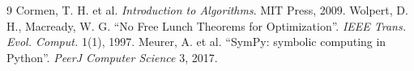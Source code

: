 \documentclass[11pt]{article}
\begin{document}
\begin{thebibliography}{9}
 Cormen, T. H. et al. \textit{Introduction to Algorithms}. MIT Press, 2009.
 Wolpert, D. H., Macready, W. G. “No Free Lunch Theorems for Optimization”. \textit{IEEE Trans. Evol. Comput.} 1(1), 1997.
 Meurer, A. et al. “SymPy: symbolic computing in Python”. \textit{PeerJ Computer Science} 3, 2017.
\end{thebibliography}
\end{document}
